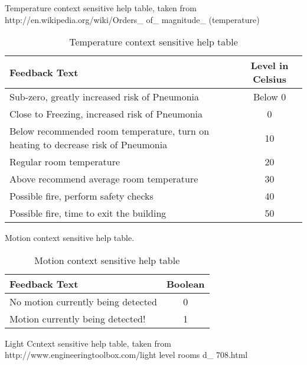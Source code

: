 \documentclass{article}
\begin{document}
\noindent
Temperature context sensitive help table, taken from http://en.wikipedia.org/wiki/Orders\_ of\_ magnitude\_ (temperature)

\begin{table}[H]
\def\arraystretch{2}%
\begin{center}
 \begin{tabular}{|| L{8cm} | c ||} 
 \hline
 \textbf{Feedback Text} & \textbf{Level in Celsius}  \\ [0.5ex] 
 \hline\hline
 Sub-zero, greatly increased risk of Pneumonia & Below 0 \\ 
 \hline
 Close to Freezing, increased risk of Pneumonia & 0 \\
 \hline
 Below recommended room temperature, turn on heating to decrease risk of Pneumonia & 10 \\
 \hline
 Regular room temperature & 20 \\ [1ex] 
 \hline
 Above recommend average room temperature & 30 \\ [1ex] 
 \hline
 Possible fire, perform safety checks & 40 \\ [1ex] 
 \hline
 Possible fire, time to exit the building & 50 \\ [1ex] 
 \hline
\end{tabular}
\end{center}
\caption{Temperature context sensitive help table}
\label{table:testing_op_timings}
\end{table}

\newpage
\noindent
Motion context sensitive help table.

\begin{table}[H]
\def\arraystretch{2}%
\begin{center}
 \begin{tabular}{|| L{8cm} | c ||} 
 \hline
 \textbf{Feedback Text} & \textbf{Boolean}  \\ [0.5ex] 
 \hline\hline
 No motion currently being detected & 0 \\ 
 \hline
 Motion currently being detected! & 1 \\
 \hline
\end{tabular}
\end{center}
\caption{Motion context sensitive help table}
\label{table:testing_op_timings}
\end{table}

\noindent
Light Ccntext sensitive help table, taken from http://www.engineeringtoolbox.com/light\- level\- rooms\- d\_ 708.html
\end{document}
